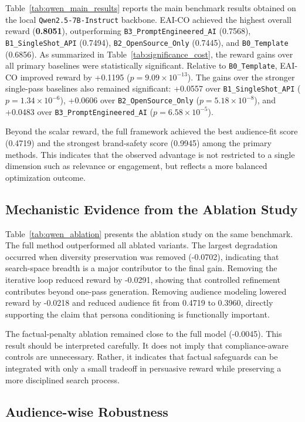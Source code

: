 \documentclass[preprint,12pt]{elsarticle}
\begin{document}
Table~\ref{tab:qwen_main_results} reports the main benchmark results obtained on the local \texttt{Qwen2.5-7B-Instruct} backbone. EAI-CO achieved the highest overall reward (\textbf{0.8051}), outperforming \texttt{B3\_PromptEngineered\_AI} (0.7568), \texttt{B1\_SingleShot\_API} (0.7494), \texttt{B2\_OpenSource\_Only} (0.7445), and \texttt{B0\_Template} (0.6856). As summarized in Table~\ref{tab:significance_cost}, the reward gains over all primary baselines were statistically significant. Relative to \texttt{B0\_Template}, EAI-CO improved reward by +0.1195 ($p=9.09\times10^{-13}$). The gains over the stronger single-pass baselines also remained significant: +0.0557 over \texttt{B1\_SingleShot\_API} ($p=1.34\times10^{-6}$), +0.0606 over \texttt{B2\_OpenSource\_Only} ($p=5.18\times10^{-8}$), and +0.0483 over \texttt{B3\_PromptEngineered\_AI} ($p=6.58\times10^{-5}$).

Beyond the scalar reward, the full framework achieved the best audience-fit score (0.4719) and the strongest brand-safety score (0.9945) among the primary methods. This indicates that the observed advantage is not restricted to a single dimension such as relevance or engagement, but reflects a more balanced optimization outcome.

\subsection{Mechanistic Evidence from the Ablation Study}

Table~\ref{tab:qwen_ablation} presents the ablation study on the same benchmark. The full method outperformed all ablated variants. The largest degradation occurred when diversity preservation was removed (-0.0702), indicating that search-space breadth is a major contributor to the final gain. Removing the iterative loop reduced reward by -0.0291, showing that controlled refinement contributes beyond one-pass generation. Removing audience modeling lowered reward by -0.0218 and reduced audience fit from 0.4719 to 0.3960, directly supporting the claim that persona conditioning is functionally important.

The factual-penalty ablation remained close to the full model (-0.0045). This result should be interpreted carefully. It does not imply that compliance-aware controls are unnecessary. Rather, it indicates that factual safeguards can be integrated with only a small tradeoff in persuasive reward while preserving a more disciplined search process.

\subsection{Audience-wise Robustness}
\end{document}
